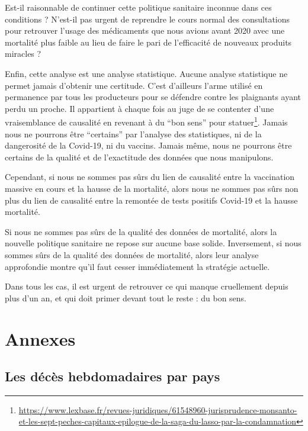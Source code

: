 \documentclass[
]{article}
\begin{document}
Est-il raisonnable de continuer cette politique sanitaire inconnue dans
ces conditions ? N'est-il pas urgent de reprendre le cours normal des
consultations pour retrouver l'usage des médicaments que nous avions
avant 2020 avec une mortalité plus faible au lieu de faire le pari de
l'efficacité de nouveaux produits miracles ?

Enfin, cette analyse est une analyse statistique. Aucune analyse
statistique ne permet jamais d'obtenir une certitude. C'est d'ailleurs
l'arme utilisé en permanence par tous les producteurs pour se défendre
contre les plaignants ayant perdu un proche. Il appartient à chaque fois
au juge de se contenter d'une vraisemblance de causalité en revenant à
du ``bon sens'' pour statuer\footnote{\url{https://www.lexbase.fr/revues-juridiques/61548960-jurisprudence-monsanto-et-les-sept-peches-capitaux-epilogue-de-la-saga-du-lasso-par-la-condamnation}}.
Jamais nous ne pourrons être ``certains'' par l'analyse des
statistiques, ni de la dangerosité de la Covid-19, ni du vaccins. Jamais
même, nous ne pourrons être certains de la qualité et de l'exactitude
des données que nous manipulons.

Cependant, si nous ne sommes pas sûrs du lien de causalité entre la
vaccination massive en cours et la hausse de la mortalité, alors nous ne
sommes pas sûrs non plus du lien de causalité entre la remontée de tests
positifs Covid-19 et la hausse mortalité.

Si nous ne sommes pas sûrs de la qualité des données de mortalité, alors
la nouvelle politique sanitaire ne repose sur aucune base solide.
Inversement, si nous sommes sûrs de la qualité des données de mortalité,
alors leur analyse approfondie montre qu'il faut cesser immédiatement la
stratégie actuelle.

Dans tous les cas, il est urgent de retrouver ce qui manque cruellement
depuis plus d'un an, et qui doit primer devant tout le reste : du bon
sens.

\hypertarget{annexes}{%
\section{Annexes}\label{annexes}}

\hypertarget{les-duxe9cuxe8s-hebdomadaires-par-pays}{%
\subsection{Les décès hebdomadaires par
pays}\label{les-duxe9cuxe8s-hebdomadaires-par-pays}}
\end{document}
